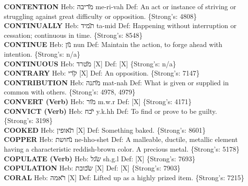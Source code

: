 {\textbf{CONTENTION} Heb: {\large\H מריבה} me-ri-vah Def: An act or instance of striving or struggling against great difficulty or opposition. \{Strong's: 4808\}\hfill{}\\

\textbf{CONTINUALLY} Heb: {\large\H תמיד} ta-mid Def: Happening without interruption or cessation; continuous in time. \{Strong's: 8548\}\hfill{}\\

\textbf{CONTINUE} Heb: {\large\H נון} nun Def: Maintain the action, to forge ahead with intention. \{Strong's: n/a\}\hfill{}\\

\textbf{CONTINUOUS} Heb: {\large\H מטרד} {[}X{]} Def: {[}X{]} \{Strong's: n/a\}\hfill{}\\

\textbf{CONTRARY} Heb: {\large\H קרי} {[}X{]} Def: An opposition. \{Strong's: 7147\}\hfill{}\\

\textbf{CONTRIBUTION} Heb: {\large\H מתנה} mat-nah Def: What is given or supplied in common with others. \{Strong's: 4978, 4979\}\hfill{}\\

\textbf{CONVERT (Verb)} Heb: {\large\H מור} m.w.r Def: {[}X{]} \{Strong's: 4171\}\hfill{}\\

\textbf{CONVICT (Verb)} Heb: {\large\H יכח} y.k.hh Def: To find or prove to be guilty. \{Strong's: 3198\}\hfill{}\\

\textbf{COOKED} Heb: {\large\H תאופין} {[}X{]} Def: Something baked. \{Strong's: 8601\}\hfill{}\\

\textbf{COPPER} Heb: {\large\H נחושת} ne-hho-shet Def: A malleable, ductile, metallic element having a characteristic reddish-brown color. A precious metal. \{Strong's: 5178\}\hfill{}\\

\textbf{COPULATE (Verb)} Heb: {\large\H שגל} sh.g.l Def: {[}X{]} \{Strong's: 7693\}\hfill{}\\

\textbf{COPULATION} Heb: {\large\H שכובת} {[}X{]} Def: {[}X{]} \{Strong's: 7903\}\hfill{}\\

\textbf{CORAL} Heb: {\large\H ראמה} {[}X{]} Def: Lifted up as a highly prized item. \{Strong's: 7215\}\hfill{}\\

}
